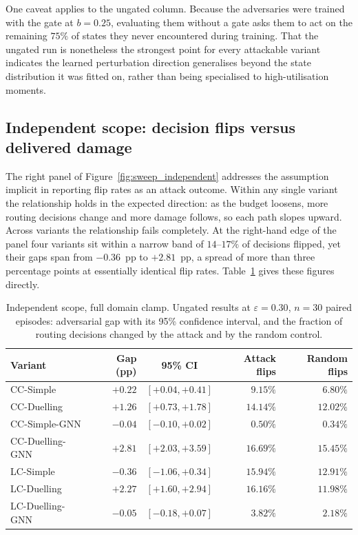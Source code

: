 One caveat applies to the ungated column. Because the adversaries were trained with
the gate at $b = 0.25$, evaluating them without a gate asks them to act on the
remaining $75\%$ of states they never encountered during training. That the ungated
run is nonetheless the strongest point for every attackable variant indicates the
learned perturbation direction generalises beyond the state distribution it was
fitted on, rather than being specialised to high-utilisation moments.

\subsection{Independent scope: decision flips versus delivered damage}
\label{subsec:results_ind_flips}

The right panel of Figure~\ref{fig:sweep_independent} addresses the assumption
implicit in reporting flip rates as an attack outcome. Within any single variant
the relationship holds in the expected direction: as the budget loosens, more
routing decisions change and more damage follows, so each path slopes upward.
Across variants the relationship fails completely. At the right-hand edge of the
panel four variants sit within a narrow band of $14$--$17\%$ of decisions flipped,
yet their gaps span from $-0.36$~pp to $+2.81$~pp, a spread of more than three
percentage points at essentially identical flip rates.
Table~\ref{tab:ungated_detail_independent} gives these figures directly.

\begin{table}[htbp]
  \centering
  \caption{Independent scope, full domain clamp. Ungated results at
           $\varepsilon = 0.30$, $n = 30$ paired episodes: adversarial gap with its
           95\% confidence interval, and the fraction of routing decisions changed by
           the attack and by the random control.}
  \label{tab:ungated_detail_independent}
  \begin{tabular}{lrcrr}
    \hline
    \textbf{Variant} & \textbf{Gap (pp)} & \textbf{95\% CI} & \textbf{Attack flips} & \textbf{Random flips} \\
    \hline
    CC-Simple        & $+0.22$ & $[+0.04, +0.41]$ & $9.15\%$  & $6.80\%$  \\
    CC-Duelling      & $+1.26$ & $[+0.73, +1.78]$ & $14.14\%$ & $12.02\%$ \\
    CC-Simple-GNN    & $-0.04$ & $[-0.10, +0.02]$ & $0.50\%$  & $0.34\%$  \\
    CC-Duelling-GNN  & $+2.81$ & $[+2.03, +3.59]$ & $16.69\%$ & $15.45\%$ \\
    LC-Simple        & $-0.36$ & $[-1.06, +0.34]$ & $15.94\%$ & $12.91\%$ \\
    LC-Duelling      & $+2.27$ & $[+1.60, +2.94]$ & $16.16\%$ & $11.98\%$ \\
    LC-Duelling-GNN  & $-0.05$ & $[-0.18, +0.07]$ & $3.82\%$  & $2.18\%$  \\
    \hline
  \end{tabular}
\end{table}

